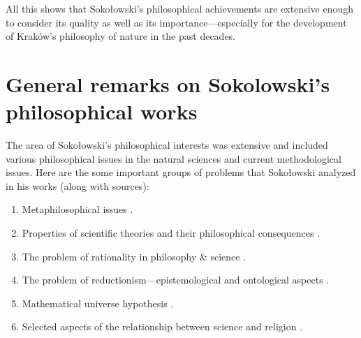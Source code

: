 \documentclass[%
  manuscript=article,
  year=2024,
  volume=77,
  doi=00000.000,
]{zfn}
\begin{document}
All this shows that Sokołowski's philosophical achievements are extensive enough to consider its quality as well as its importance---especially for the development of Kraków's philosophy of nature in the past decades.



\section{General remarks on Sokolowski's philosophical works }

The area of Sokołowski's philosophical interests was extensive and included various philosophical issues in the natural sciences and current methodological issues. Here are the some important groups of problems that Sokołowski analyzed in his works (along with sources):



\begin{enumerate}[label=\alph*.]

\item Metaphilosophical issues 
\parencites[numerous remarks in:][]{Sokoowski1986Pluralizm}[][]{Sokoowski1989Gos}[][]{Sokoowski1990Nadwyzkowosc}[][]{Sokoowski2014Czy}[][]{Sokoowski2017Kopoty}.%


\item Properties of scientific theories and their philosophical consequences 
\parencites[][]{Sokoowski1978Czy}[][]{Sokoowski1983Jezyk}[][]{Sokoowski1986Pluralizm}[][]{Sokoowski1987Alberta}[][]{Sokoowski1989Gos}[][]{Sokoowski1994Wszechswiat}[][]{Sokoowski2000Czas}[][]{Sokoowski2006Teorie}[][]{Sokoowski2007Czowiek}[][]{Sokoowski2008Czego}[][]{Sokoowski2014Czy}[][]{Sokoowski2015Granice}[][]{Sokoowski2017Kopoty}.%


\item The problem of rationality in philosophy \& science 
\parencites[][]{Sokoowski2006Alicja}[][]{Sokoowski2011O}.%


\item The problem of reductionism---epistemological and ontological aspects 
\parencites[][]{Sokoowski1996W}[][]{Sokoowski1999Maa}[][]{Sokoowski2001Wspoczesne}.%


\item Mathematical universe hypothesis 
\parencites[][]{Sokoowski1990Nadwyzkowosc}[][]{Sokoowski2011O}[][]{Sokoowski2011Pare}[][]{Sokoowski2015Co}.%


\item Selected aspects of the relationship between science and religion 
\parencites[][]{Sokoowski1991Posowie}[][]{Sokoowski1993Koscio}[][]{Sokoowski2001Wspoczesne}[][]{Sokoowski2011O}[][]{Sokoowski2014Czy}.%


\end{enumerate}
\end{document}
